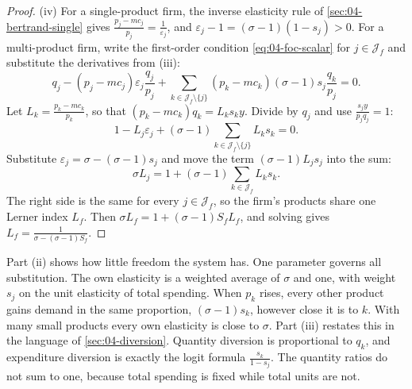 \begin{proof}
(iv) For a single-product firm, the inverse elasticity rule of \cref{sec:04-bertrand-single} gives
$\frac{p_j - mc_j}{p_j} = \frac{1}{\varepsilon_j}$, and $\varepsilon_j - 1 = (\sigma - 1)(1 - s_j) > 0$. For a
multi-product firm, write the first-order condition \eqref{eq:04-foc-scalar} for $j \in \mathcal{J}_f$ and substitute
the derivatives from (iii):
\begin{equation*}
q_j - (p_j - mc_j)\varepsilon_j\frac{q_j}{p_j} + \sum_{k\in\mathcal{J}_f\setminus\{j\}}(p_k - mc_k)(\sigma - 1)s_j\frac{q_k}{p_j} = 0 .
\end{equation*}
Let $L_k = \frac{p_k - mc_k}{p_k}$, so that $(p_k - mc_k)q_k = L_ks_ky$. Divide by $q_j$ and use $\frac{s_jy}{p_jq_j} = 1$:
\begin{equation*}
1 - L_j\varepsilon_j + (\sigma - 1)\sum_{k\in\mathcal{J}_f\setminus\{j\}}L_ks_k = 0 .
\end{equation*}
Substitute $\varepsilon_j = \sigma - (\sigma - 1)s_j$ and move the term $(\sigma - 1)L_js_j$ into the sum:
\begin{equation*}
\sigma L_j = 1 + (\sigma - 1)\sum_{k\in\mathcal{J}_f}L_ks_k .
\end{equation*}
The right side is the same for every $j \in \mathcal{J}_f$, so the firm's products share one Lerner index $L_f$.
Then $\sigma L_f = 1 + (\sigma - 1)S_fL_f$, and solving gives $L_f = \frac{1}{\sigma - (\sigma - 1)S_f}$.
\end{proof}

Part (ii) shows how little freedom the system has. One parameter governs all substitution. The own elasticity is
a weighted average of $\sigma$ and one, with weight $s_j$ on the unit elasticity of total spending. When $p_k$ rises,
every other product gains demand in the same proportion, $(\sigma - 1)s_k$, however close it is to $k$. With many
small products every own elasticity is close to $\sigma$. Part (iii) restates this in the language of
\cref{sec:04-diversion}. Quantity diversion is proportional to $q_k$, and expenditure diversion is exactly the logit
formula $\frac{s_k}{1 - s_j}$. The quantity ratios do not sum to one, because total spending is fixed while total
units are not.

